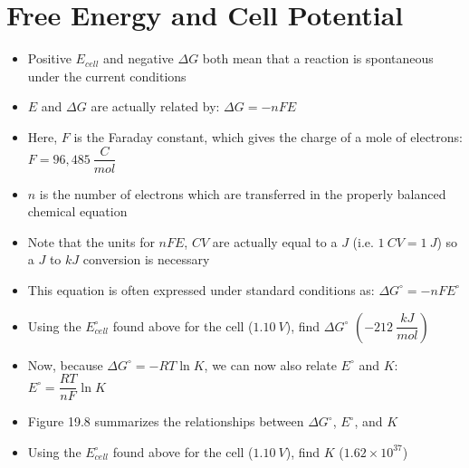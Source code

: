 \documentclass[12pt, openany, letterpaper]{memoir}
\begin{document}
\section{Free Energy and Cell Potential}
\begin{itemize}
	\item Positive $E_{cell}$ and negative $\Delta G$ both mean that a reaction is spontaneous under the current conditions
	\item $E$ and $\Delta G$ are actually related by: $\Delta G=-nFE$
	\item Here, $F$ is the Faraday constant, which gives the charge of a mole of electrons: $F=96,485~\dfrac{C}{mol}$
	\item $n$ is the number of electrons which are transferred in the properly balanced chemical equation
	\item Note that the units for $nFE$, $CV$ are actually equal to a $J$ (i.e. $1~CV=1~J$) so a $J$ to $kJ$ conversion is necessary
	\item This equation is often expressed under standard conditions as: $\Delta G^\circ = -nFE^\circ$
	\item Using the $E^\circ_{cell}$ found above for the  cell ($1.10~V$), find $\Delta G^{\circ}$ \hspace{1em} $\left(-212~\dfrac{kJ}{mol}\right)$
	\item Now, because $\Delta G^\circ = -RT\ln K$, we can now also relate $E^\circ$ and $K$: \hspace{1em} $E^\circ = \dfrac{RT}{nF}\ln K$
	\item Figure 19.8 summarizes the relationships between $\Delta G^\circ$, $E^\circ$, and $K$
	\item Using the $E^\circ_{cell}$ found above for the  cell ($1.10~V$), find $K$ \hspace{1em} ($1.62\times10^{37}$)
\end{itemize}
\end{document}
